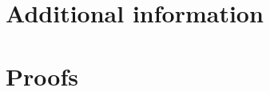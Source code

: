 \documentclass[a4paper,11pt]{kth-mag}
\begin{document}
%
\cleardoublepage


\cleardoublepage
\appendix
{}


\chapter{Additional information} \label{appA}

\chapter{Proofs} \label{appB}

\cleardoublepage   
\cleartoverso %
%

\end{document}
